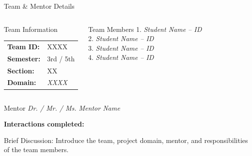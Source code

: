 \documentclass[aspectratio=169,11pt]{beamer}
\newcommand{\smallnote}[1]{%
\vspace{0.08cm}
{\scriptsize\color{GEUGrey}#1}
}
\newcommand{\placeholder}[1]{%
\textit{\color{GEUGrey}#1}
}
\begin{document}
\begin{frame}{Team \& Mentor Details}

\begin{columns}[T,totalwidth=\textwidth]


\begin{block}{Team Information}
\begin{tabular}{@{}ll@{}}
\textbf{Team ID:} & XXXX\\
\textbf{Semester:} & 3rd / 5th\\
\textbf{Section:} & XX\\
\textbf{Domain:} & \placeholder{XXXX}
\end{tabular}
\end{block}


\begin{block}{Team Members}
1.\quad \placeholder{Student Name -- ID}\\
2.\quad \placeholder{Student Name -- ID}\\
3.\quad \placeholder{Student Name -- ID}\\
4.\quad \placeholder{Student Name -- ID}
\end{block}

\end{columns}

\vspace{2mm}

\begin{block}{Mentor}
\placeholder{Dr. / Mr. / Ms. Mentor Name}
\hfill
\textbf{Interactions completed:}
\underline{\hspace{12mm}}
\end{block}

\vfill

\smallnote{
Brief Discussion: Introduce the team, project domain, mentor,
and responsibilities of the team members.
}

\end{frame}
\end{document}
